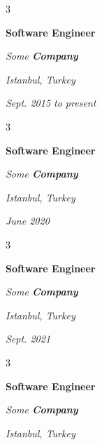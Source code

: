 \documentclass[10pt, letterpaper]{article}
\newenvironment{threecolentry}[3][]{
    \onecolentry
    \def\thirdColumn{#3}
    \setcolumnwidth{0.6 cm, \fill, 4.5 cm}
    \begin{paracol}{3}
    #2 \switchcolumn
}{
    \switchcolumn \raggedleft \thirdColumn
    \end{paracol}
    \endonecolentry
} %
\begin{document}
        \begin{threecolentry}{
            \vspace*{\fill}
            \textbullet
            \vspace*{3px}
            \vspace*{\fill}
        }{
        \textit{Istanbul, Turkey}    
            
        \textit{Sept. 2015 to present}}
            \textbf{Software Engineer}
            
            \textit{Some \textbf{Company}}
        \end{threecolentry}



        \vspace{0.2 cm-3px}

        \begin{threecolentry}{
            \vspace*{\fill}
            \textbullet
            \vspace*{3px}
            \vspace*{\fill}
        }{
        \textit{Istanbul, Turkey}    
            
        \textit{June 2020}}
            \textbf{Software Engineer}
            
            \textit{Some \textbf{Company}}
        \end{threecolentry}



        \vspace{0.2 cm-3px}

        \begin{threecolentry}{
            \vspace*{\fill}
            \textbullet
            \vspace*{3px}
            \vspace*{\fill}
        }{
        \textit{Istanbul, Turkey}    
            
        \textit{Sept. 2021}}
            \textbf{Software Engineer}
            
            \textit{Some \textbf{Company}}
        \end{threecolentry}



        \vspace{0.2 cm-3px}

        \begin{threecolentry}{
            \vspace*{\fill}
            \textbullet
            \vspace*{3px}
            \vspace*{\fill}
        }{
        \textit{Istanbul, Turkey}    
            
        }
            \textbf{Software Engineer}
            
            \textit{Some \textbf{Company}}
        \end{threecolentry}
\end{document}
